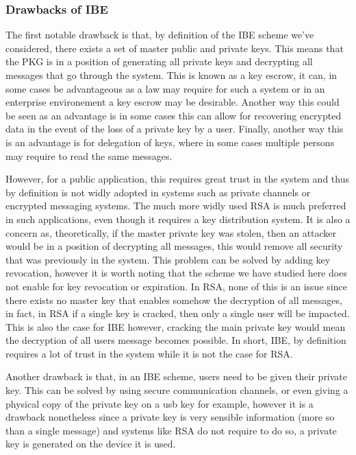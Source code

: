 \documentclass[conference]{IEEEtran}
\begin{document}
\subsubsection{Drawbacks of IBE}
The first notable drawback is that, by definition of the 
IBE scheme we've considered, there exists a set of master
public and private keys. This means that the PKG is in a position
of generating all private keys and decrypting all messages that go through 
the system. This is known as a key escrow, it can, in some cases
be advantageous as a law may require for such a system or in an 
enterprise environement a key escrow may be desirable. Another
way this could be seen as an advantage is in some cases this can allow 
for recovering encrypted data in the event of the loss of a private key by a user. 
Finally, another way this is an advantage is for delegation of keys, where in some 
cases multiple persons may require to read the same messages.


However, for a public application, this requires great trust in the system 
and thus by definition is not widly adopted in systems such as 
private channels or encrypted messaging systems. The much more 
widly used RSA is much preferred in such applications, even though it requires
a key distribution system.
It is also a concern as, theoretically, if the master private key was stolen,
then an attacker would be in a position of decrypting all messages, this 
would remove all security that was previously in the system. This problem
can be solved by adding key revocation, however it is worth noting that the 
scheme we have studied here does not enable for key revocation or expiration. 
In RSA, none of this is an issue since there exists no master key that enables 
somehow the decryption of all messages, in fact, in RSA if a single key is cracked,
then only a single user will be impacted. This is also the case for IBE however,
cracking the main private key would mean the decryption of all users message becomes possible.
In short, IBE, by definition requires a lot of trust in the system while it is not 
the case for RSA.


Another drawback is that, in an IBE scheme, users need to be given their private key.
This can be solved by using secure communication channels, or even giving a physical copy of the 
private key on a usb key for example, however it is a drawback nonetheless since 
a private key is very sensible information (more so than a single message) and systems 
like RSA do not require to do so, a private key is generated on the device it is used.
\end{document}
